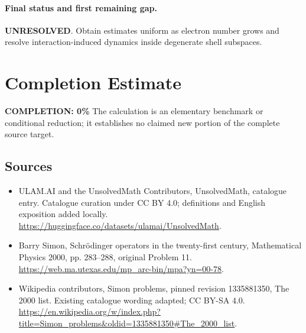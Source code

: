 \documentclass[11pt]{article}
\begin{document}
\paragraph{Final status and first remaining gap.}
\textbf{UNRESOLVED}. Obtain estimates uniform as electron number grows and resolve interaction-induced dynamics inside degenerate shell subspaces.

\section{Completion Estimate}
\noindent\textbf{COMPLETION: 0\%}
The calculation is an elementary benchmark or conditional reduction; it establishes no claimed new portion of the complete source target.

\subsection{Sources}
\begin{itemize}
\item[\hypertarget{source:statement:1}{S1}] ULAM.AI and the UnsolvedMath Contributors, UnsolvedMath, catalogue entry. Catalogue curation under CC BY 4.0; definitions and English exposition added locally.
\url{https://huggingface.co/datasets/ulamai/UnsolvedMath}.
\item[\hypertarget{source:statement:2}{S2}] Barry Simon, Schrödinger operators in the twenty-first century, Mathematical Physics 2000, pp. 283–288, original Problem 11.
\url{https://web.ma.utexas.edu/mp_arc-bin/mpa?yn=00-78}.
\item[\hypertarget{source:statement:3}{S3}] Wikipedia contributors, Simon problems, pinned revision 1335881350, The 2000 list. Existing catalogue wording adapted; CC BY-SA 4.0.
\url{https://en.wikipedia.org/w/index.php?title=Simon_problems&oldid=1335881350#The_2000_list}.
\end{itemize}
\label{end:statement}
\end{document}
